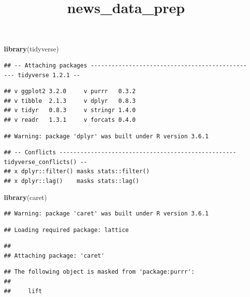\documentclass[]{article}
\title{news\_data\_prep}
\author{}
\date{}
\newenvironment{Shaded}{\begin{snugshade}}{\end{snugshade}}
\newcommand{\KeywordTok}[1]{\textcolor[rgb]{0.13,0.29,0.53}{\textbf{#1}}}
\newcommand{\NormalTok}[1]{#1}
\begin{document}
\maketitle

\begin{Shaded}
\begin{Highlighting}[]
\KeywordTok{library}\NormalTok{(tidyverse)}
\end{Highlighting}
\end{Shaded}

\begin{verbatim}
## -- Attaching packages ------------------------------------------------ tidyverse 1.2.1 --
\end{verbatim}

\begin{verbatim}
## v ggplot2 3.2.0     v purrr   0.3.2
## v tibble  2.1.3     v dplyr   0.8.3
## v tidyr   0.8.3     v stringr 1.4.0
## v readr   1.3.1     v forcats 0.4.0
\end{verbatim}

\begin{verbatim}
## Warning: package 'dplyr' was built under R version 3.6.1
\end{verbatim}

\begin{verbatim}
## -- Conflicts --------------------------------------------------- tidyverse_conflicts() --
## x dplyr::filter() masks stats::filter()
## x dplyr::lag()    masks stats::lag()
\end{verbatim}

\begin{Shaded}
\begin{Highlighting}[]
\KeywordTok{library}\NormalTok{(caret)}
\end{Highlighting}
\end{Shaded}

\begin{verbatim}
## Warning: package 'caret' was built under R version 3.6.1
\end{verbatim}

\begin{verbatim}
## Loading required package: lattice
\end{verbatim}

\begin{verbatim}
## 
## Attaching package: 'caret'
\end{verbatim}

\begin{verbatim}
## The following object is masked from 'package:purrr':
## 
##     lift
\end{verbatim}
\end{document}
